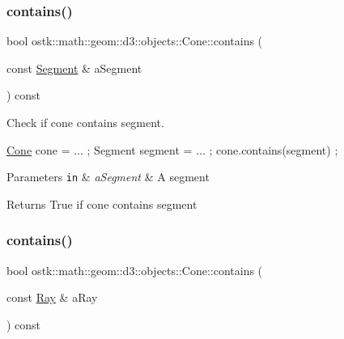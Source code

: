 \subsubsection{\texorpdfstring{contains()}{contains()}\hspace{0.1cm}{\footnotesize\ttfamily [3/6]}}
{\footnotesize\ttfamily bool ostk\+::math\+::geom\+::d3\+::objects\+::\+Cone\+::contains (\begin{DoxyParamCaption}\item[{const \hyperlink{classostk_1_1math_1_1geom_1_1d3_1_1objects_1_1_segment}{Segment} \&}]{a\+Segment }\end{DoxyParamCaption}) const}



Check if cone contains segment. 


\begin{DoxyCode}
\hyperlink{classostk_1_1math_1_1geom_1_1d3_1_1objects_1_1_cone_ac86773a78cf513900e8b0d3a2709bfcb}{Cone} cone = ... ;
Segment segment = ... ;
cone.contains(segment) ;
\end{DoxyCode}



\begin{DoxyParams}[1]{Parameters}
\mbox{\tt in}  & {\em a\+Segment} & A segment \\
\hline
\end{DoxyParams}
\begin{DoxyReturn}{Returns}
True if cone contains segment 
\end{DoxyReturn}
\mbox{\label{classostk_1_1math_1_1geom_1_1d3_1_1objects_1_1_cone_adc42e76b33717df0f6dbe91caea7c9de}} 
\subsubsection{\texorpdfstring{contains()}{contains()}\hspace{0.1cm}{\footnotesize\ttfamily [4/6]}}
{\footnotesize\ttfamily bool ostk\+::math\+::geom\+::d3\+::objects\+::\+Cone\+::contains (\begin{DoxyParamCaption}\item[{const \hyperlink{classostk_1_1math_1_1geom_1_1d3_1_1objects_1_1_ray}{Ray} \&}]{a\+Ray }\end{DoxyParamCaption}) const}



